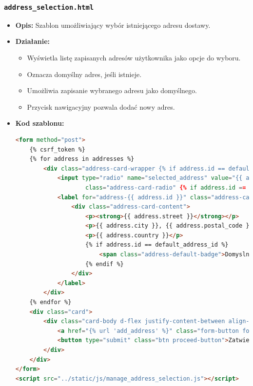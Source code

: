 \documentclass[12pt,a4paper,oneside]{article}
\theoremstyle{definition}
\numberwithin{equation}{section}
\begin{document}
\subsubsection*{\texttt{address\_selection.html}}
\label{sec:address_selection_template}
\begin{itemize}
    \item \textbf{Opis:} Szablon umożliwiający wybór istniejącego adresu dostawy.
    \item \textbf{Działanie:}
        \begin{itemize}
            \item Wyświetla listę zapisanych adresów użytkownika jako opcje do wyboru.
            \item Oznacza domyślny adres, jeśli istnieje.
            \item Umożliwia zapisanie wybranego adresu jako domyślnego.
            \item Przycisk nawigacyjny pozwala dodać nowy adres.
        \end{itemize}
    \item \textbf{Kod szablonu:}
\begin{lstlisting}[language=HTML, caption=Szablon address\_selection.html]
<form method="post">
    {% csrf_token %}
    {% for address in addresses %}
        <div class="address-card-wrapper {% if address.id == default_address_id %}address-default{% endif %}">
            <input type="radio" name="selected_address" value="{{ address.id }}" id="address-{{ address.id }}"
                    class="address-card-radio" {% if address.id == default_address_id %}checked{% endif %}>
            <label for="address-{{ address.id }}" class="address-card-label">
                <div class="address-card-content">
                    <p><strong>{{ address.street }}</strong></p>
                    <p>{{ address.city }}, {{ address.postal_code }}</p>
                    <p>{{ address.country }}</p>
                    {% if address.id == default_address_id %}
                        <span class="address-default-badge">Domyslny</span>
                    {% endif %}
                </div>
            </label>
        </div>
    {% endfor %}
    <div class="card">
        <div class="card-body d-flex justify-content-between align-items-center">
            <a href="{% url 'add_address' %}" class="form-button form-button-secondary">Dodaj nowy adres</a>
            <button type="submit" class="btn proceed-button">Zatwierdz adres</button>
        </div>
    </div>
</form>
<script src="../static/js/manage_address_selection.js"></script>
\end{lstlisting}
\end{itemize}
\end{document}
